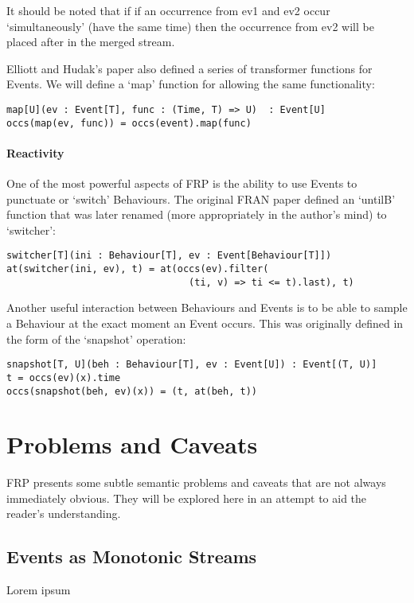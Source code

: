 \documentclass[12pt]{article}
\begin{document}
        It should be noted that if if an occurrence from ev1 and ev2 occur `simultaneously' (have the same time) then
        the occurrence from ev2 will be placed after in the merged stream.
         
         Elliott and Hudak's paper also defined a series of transformer functions for Events. We will define a
         `map' function for allowing the same functionality:
 
\begin{verbatim}
map[U](ev : Event[T], func : (Time, T) => U)  : Event[U]
occs(map(ev, func)) = occs(event).map(func)
\end{verbatim}         
          
        \paragraph{Reactivity}
          One of the most powerful aspects of FRP is the ability to use Events to punctuate or `switch' Behaviours.
          The original FRAN paper defined an `untilB' function that was later renamed (more appropriately in the
          author's mind) to `switcher':

\begin{verbatim}
switcher[T](ini : Behaviour[T], ev : Event[Behaviour[T]])
at(switcher(ini, ev), t) = at(occs(ev).filter(
                                (ti, v) => ti <= t).last), t)
\end{verbatim}

          Another useful interaction between Behaviours and Events is to be able to sample
          a Behaviour at the exact moment an Event occurs. This was originally defined in the
          form of the `snapshot' operation:

\begin{verbatim}
snapshot[T, U](beh : Behaviour[T], ev : Event[U]) : Event[(T, U)]
t = occs(ev)(x).time
occs(snapshot(beh, ev)(x)) = (t, at(beh, t))
\end{verbatim}          
          
          
  \section{Problems and Caveats}
    FRP presents some subtle semantic problems and caveats that are not always immediately obvious.
    They will be explored here in an attempt to aid the reader's understanding.
     
    \subsection{Events as Monotonic Streams}
    Lorem ipsum
    
\end{document}
